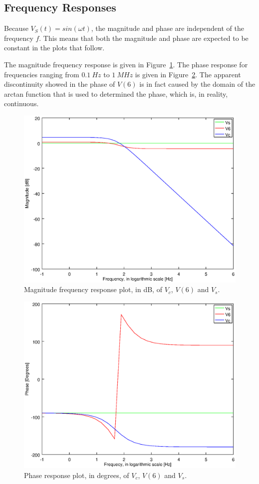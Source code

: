 \subsection{Frequency Responses}

Because $V_S(t) = sin(\omega t)$, the magnitude and phase are independent of the frequency $f$. This means that both the magnitude and phase are expected to be constant in the plots that follow.

The magnitude frequency response is given in Figure~\ref{fig:mag}.
The phase response for frequencies ranging from $0.1~Hz$ to $1~MHz$ is given in Figure~\ref{fig:phase}. The apparent discontinuity showed in the phase of $V(6)$ is in fact caused by the domain of the arctan function that is used to determined the phase, which is, in reality, continuous.

\clearpage

\begin{figure}[h] \centering
\includegraphics[width=0.5\linewidth]{magnitude.eps}
	\caption{Magnitude frequency response plot, in dB, of $V_{c}$, $V(6)$ and $V_{s}$.}
        \label{fig:mag}
\end{figure}


\begin{figure}[h] \centering
\includegraphics[width=0.7\linewidth]{phase.eps}
	\caption{Phase response plot, in degrees, of $V_{c}$, $V(6)$ and $V_{s}$.}
        \label{fig:phase}
\end{figure}
